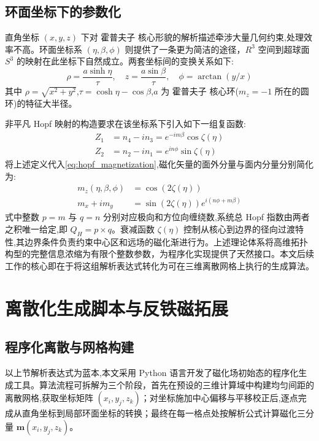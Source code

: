 \subsection{环面坐标下的参数化}
直角坐标 $(x,y,z)$ 下对 霍普夫子 核心形貌的解析描述牵涉大量几何约束,处理效率不高。环面坐标系 $(\eta, \beta, \phi)$ 则提供了一条更为简洁的途径，$R^3$ 空间到超球面 $S^3$ 的映射在此坐标下自然成立。两套坐标间的变换关系如下:
\begin{equation}
    \rho = \frac{a \sinh \eta}{\tau}, \quad z = \frac{a \sin \beta}{\tau}, \quad \phi = \arctan(y/x)
\end{equation}
其中 $\rho = \sqrt{x^2+y^2}$,$\tau = \cosh \eta - \cos \beta$,$a$ 为 霍普夫子 核心环($m_z=-1$ 所在的圆环)的特征大半径。

非平凡 Hopf 映射的构造要求在该坐标系下引入如下一组复函数:
\begin{align}
    Z_1 &= n_4 - i n_3 = e^{-im\beta} \cos \zeta(\eta) \\
    Z_2 &= n_2 - i n_1 = e^{in\phi} \sin \zeta(\eta)
\end{align}
将上述定义代入\cref{eq:hopf_magnetization},磁化矢量的面外分量与面内分量分别简化为:
\begin{align}
    m_z(\eta, \beta, \phi) &= \cos(2\zeta(\eta)) \\
    m_x + i m_y &= \sin(2\zeta(\eta)) e^{i(n\phi + m\beta)}
\end{align}
式中整数 $p=m$ 与 $q=n$ 分别对应极向和方位向缠绕数,系统总 Hopf 指数由两者之积唯一给定,即 $Q_H = p \times q$。衰减函数 $\zeta(\eta)$ 控制从核心到边界的径向过渡特性,其边界条件负责约束中心区和远场的磁化渐进行为。上述理论体系将高维拓扑构型的完整信息浓缩为有限个整数参数，为程序化实现提供了天然接口。本文后续工作的核心即在于将这组解析表达式转化为可在三维离散网格上执行的生成算法。

\section{离散化生成脚本与反铁磁拓展}

\subsection{程序化离散与网格构建}
以上节解析表达式为蓝本,本文采用 Python 语言开发了磁化场初始态的程序化生成工具。算法流程可拆解为三个阶段，首先在预设的三维计算域中构建均匀间距的离散网格,获取坐标矩阵 $(x_i, y_j, z_k)$；对坐标施加中心偏移与平移校正后,逐点完成从直角坐标到局部环面坐标的转换；最终在每一格点处按解析公式计算磁化三分量 $\mathbf{m}(x_i, y_j, z_k)$。


